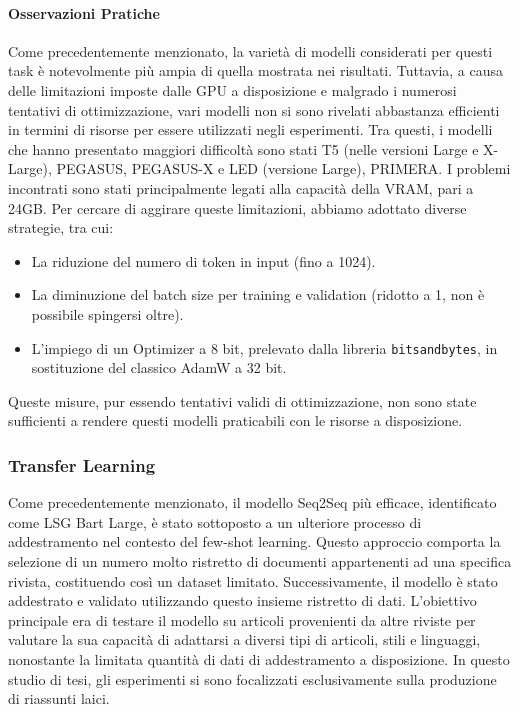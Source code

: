 \documentclass[12pt,a4paper,twoside,openright]{book}
\begin{document}
\paragraph{Osservazioni Pratiche}
Come precedentemente menzionato, la varietà di modelli considerati per questi task è notevolmente più ampia di quella mostrata nei risultati. Tuttavia, a causa delle limitazioni imposte dalle GPU a disposizione e malgrado i numerosi tentativi di ottimizzazione, vari modelli non si sono rivelati abbastanza efficienti in termini di risorse per essere utilizzati negli esperimenti.
Tra questi, i modelli che hanno presentato maggiori difficoltà sono stati T5 (nelle versioni Large e X-Large), PEGASUS, PEGASUS-X e LED (versione Large), PRIMERA.
I problemi incontrati sono stati principalmente legati alla capacità della VRAM, pari a 24GB. Per cercare di aggirare queste limitazioni, abbiamo adottato diverse strategie, tra cui:
\begin{itemize}
    \item La riduzione del numero di token in input (fino a 1024).
    \item La diminuzione del batch size per training e validation (ridotto a 1, non è possibile spingersi oltre).
    \item L'impiego di un Optimizer a 8 bit, prelevato dalla libreria \texttt{bitsandbytes}, in sostituzione del classico AdamW a 32 bit.
\end{itemize}
Queste misure, pur essendo tentativi validi di ottimizzazione, non sono state sufficienti a rendere questi modelli praticabili con le risorse a disposizione.

\subsubsection{Transfer Learning}
Come precedentemente menzionato, il modello Seq2Seq più efficace, identificato come LSG Bart Large, è stato sottoposto a un ulteriore processo di addestramento nel contesto del few-shot learning. Questo approccio comporta la selezione di un numero molto ristretto di documenti appartenenti ad una specifica rivista, costituendo così un dataset limitato.
Successivamente, il modello è stato addestrato e validato utilizzando questo insieme ristretto di dati. L'obiettivo principale era di testare il modello su articoli provenienti da altre riviste per valutare la sua capacità di adattarsi a diversi tipi di articoli, stili e linguaggi, nonostante la limitata quantità di dati di addestramento a disposizione. 
In questo studio di tesi, gli esperimenti si sono focalizzati esclusivamente sulla produzione di riassunti laici.
\end{document}
